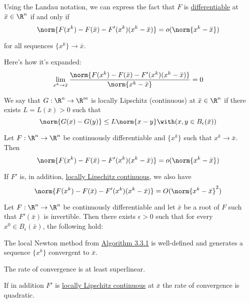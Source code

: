 
\label{b4ee31d}

Using the Landau notation, we can express the fact that $F$ is
\href{c62315d}{differentiable} at $\bar x\in\R^n$ if and only if
$$
	\norm{F(x^k)-F(\bar x)-F'(x^k)(x^k-\bar x)}=o(\norm{x^{k}-\bar x})
$$

for all sequences $\{x^k\}\to\bar x$.

Here's how it's expanded:
$$
	\lim_{x^k\to\bar x}\frac{\norm{F(x^k)-F(\bar x)-F'(x^k)(x^k-\bar x)}}{\norm{x^k-\bar x}}=0
$$

\label{ba65fa0}

We say that $G:\R^n\to\R^m$ is locally Lipschitz (continuous) at $\bar
	x\in\R^n$ if there exists $L=L(\bar x)>0$ such that
$$
	\norm{G(x)-G(y)}\leq L\norm{x-y}\with(x,y\in B_\epsilon(\bar x))
$$

\label{a71a60e}

Let $F:\R^n\to\R^n$ be continuously differentiable and $\{x^k\}$ such
that $x^k\to\bar x$. Then
$$
	\norm{F(x^k)-F(\bar x)-F'(x^k)(x^k-\bar x)}=o(\norm{x^{k}-\bar x})
$$

If $F'$ is, in addition, \href{ba65fa0}{locally Lipschitz continuous},
we also have
$$
	\norm{F(x^k)-F(\bar x)-F'(x^k)(x^k-\bar x)}=O(\norm{x^{k}-\bar x}^2)
$$

\label{fc03f3f}

Let $F:\R^n\to\R^n$ be continuously differentiable and let $\bar x$ be
a root of $F$ such that $F'(\bar x)$ is invertible. Then there exists
$\epsilon>0$ such that for every $x^0\in B_\epsilon(\bar x)$, the
following hold:
\begin{enumerata}
	\item The local Newton method from \href{abbc9be}{Algorithm 3.3.1} is
	well-defined and generates a sequence $\{x^k\}$ convergent to $\bar
		x$.
	\item The rate of convergence is at least superlinear.
	\item If in addition $F'$ is \href{ba65fa0}{locally Lipschitz
		continuous} at $\bar x$ the rate of convergence is quadratic.
\end{enumerata}

\label{f2a142c}

